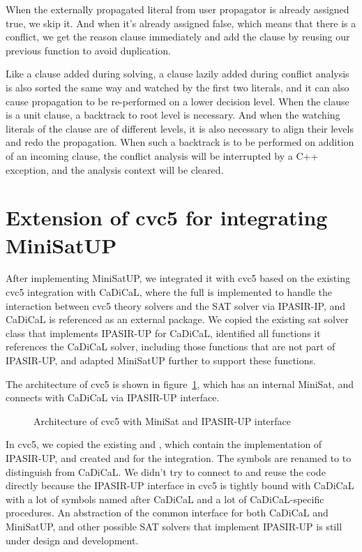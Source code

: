When the externally propagated literal from user propagator is already assigned true, we skip it. And when it's already assigned false, which means that there is a conflict, we get the reason clause immediately and add the clause by reusing our previous function  to avoid duplication.

Like a clause added during solving, a clause lazily added during conflict analysis is also sorted the same way and watched by the first two literals, and it can also cause propagation to be re-performed on a lower decision level. When the clause is a unit clause, a backtrack to root level is necessary. And when the watching literals of the clause are of different levels, it is also necessary to align their levels and redo the propagation. When such a backtrack is to be performed on addition of an incoming clause, the conflict analysis will be interrupted by a C++ exception, and the analysis context will be cleared.

\section{Extension of cvc5 for integrating MiniSatUP}

After implementing MiniSatUP, we integrated it with cvc5 based on the existing cvc5 integration with CaDiCaL, where the full  is implemented to handle the interaction between cvc5 theory solvers and the SAT solver via IPASIR-IP, and CaDiCaL is referenced as an external package. We copied the existing sat solver class that implements IPASIR-UP for CaDiCaL, identified all functions it references the CaDiCaL solver, including those functions that are not part of IPASIR-UP, and adapted MiniSatUP further to support these functions.

The architecture of cvc5 is shown in figure~\ref{fig:cvc5}, which has an internal MiniSat, and connects with CaDiCaL via IPASIR-UP interface.

\begin{figure}[h!]
  \centering
  
  \caption{Architecture of cvc5 with MiniSat and IPASIR-UP interface}
  \label{fig:cvc5}
\end{figure}

In cvc5, we copied the existing  and , which contain the implementation of IPASIR-UP, and created  and  for the integration. The symbols are renamed to  to distinguish from CaDiCaL. We didn't try to connect to and reuse the code directly because the IPASIR-UP interface in cvc5 is tightly bound with CaDiCaL with a lot of symbols named after CaDiCaL and a lot of CaDiCaL-specific procedures. An abstraction of the common interface for both CaDiCaL and MiniSatUP, and other possible SAT solvers that implement IPASIR-UP is still under design and development.

